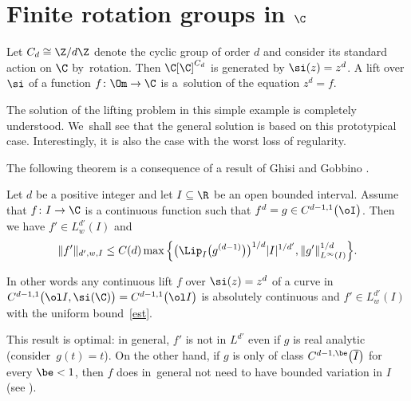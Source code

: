 \section[Finite rotation groups in C]{Finite rotation groups in $\C$}\label{radicals}

Let $C_d \cong \Z/d\Z$ denote the cyclic group of order $d$ and consider its standard action on $\C$ by~rota\-tion.
Then $\C[\C]^{C_d}$ is generated by $\si(z) = z^d$. A lift over $\si$ of a function $f \colon \Om \to \C$ is a~solution of the
equation $z^d = f$.

The solution of the lifting problem in this simple example is completely understood. We~shall see that the general
solution is based on this prototypical case. Interestingly, it is also the case with the worst loss of regularity.

The following theorem is a consequence of a result of Ghisi and Gobbino \cite{GhisiGobbino13}.

\begin{Theorem} \label{cor:radicals}
 Let $d$ be a positive integer and
 let $I \subseteq \R$ be an open bounded interval. Assume that $f \colon I \to \C$ is a continuous function such that
 $f^d = g \in C^{d-1,1}\big(\oI\big)$.
 Then we have $f' \in L^{d'}_w(I)$ and
 \begin{gather} \label{est}
 \|f'\|_{d',w,I} \le
 C(d) \max\Big\{\big(\Lip_{I}\big(g^{(d-1)}\big)\big)^{1/d}|I|^{1/d'},
 \|g'\|_{L^\infty(I)}^{1/d}\Big\}.
 \end{gather}
\end{Theorem}

In other words
any continuous lift $f$ over $\si(z) = z^d$ of a curve in $C^{d-1,1}\big(\ol I,\si(\C)\big) = C^{d-1,1}\big(\ol I\big)$
is absolutely continuous and $f' \in L^{d'}_w(I)$ with the uniform bound~\eqref{est}.

\begin{Remark} \label{optimality}
This result is optimal: in general, $f'$ is not in $L^{d'}$ even if $g$ is real analytic (consider~$g(t) = t$).
On the other hand, if $g$ is only of class $C^{d-1,\be}\big(\overline I\big)$ for every $\be<1$, then $f$
does in~general not need to have bounded variation
in $I$ (see \cite[Example 4.4]{GhisiGobbino13}).
\end{Remark}
